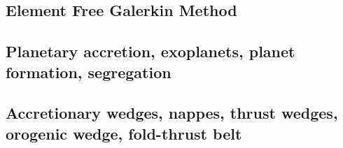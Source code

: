 \subsection{Element Free Galerkin Method}

\begin{scriptsize}
\cite{begl94b}
\cite{belg95a}
\cite{belg95b}
\cite{bekf96}\cite{como96}
\cite{bekk97}
\cite{pobe98}\cite{zhat98}
\cite{hans03}\cite{katf04}
\cite{huvv04}
\cite{yiha10}\cite{libe10}
\end{scriptsize}

\subsection{Planetary accretion, exoplanets, planet formation, segregation}

\begin{scriptsize}
\cite{lejm08}
\cite{ligt09}\cite{gogk09}
\cite{vayb10}
\cite{ligt11}\cite{vacg11}
\cite{vagc13}
\cite{gobg14}\cite{yadl14}
\cite{neum19}\cite{vayu19}
\end{scriptsize}

\subsection{Accretionary wedges, nappes, thrust wedges, orogenic wedge, fold-thrust belt} 

